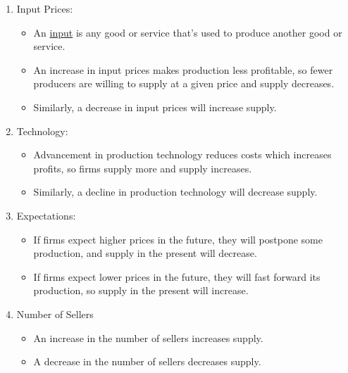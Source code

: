 	\begin{enumerate}
	
	\item Input Prices: 
	
		\begin{itemize}
		
		\item An \underline{input} is any good or service that's used to produce another good or service.
		
		\item An increase in input prices makes production less profitable, so fewer producers are willing to supply at a given price and supply decreases.
		
		\item Similarly, a decrease in input prices will increase supply.
		
		\end{itemize}
		
	\item Technology:
	
		\begin{itemize}
		
		\item Advancement in production technology reduces costs which increases profits, so firms supply more and supply increases.
		
		\item Similarly, a decline in production technology will decrease supply.
		
		\end{itemize}
		
	\item Expectations:
		
		\begin{itemize}
		
		\item If firms expect higher prices in the future, they will postpone some production, and supply in the present will decrease.
		
		\item If firms expect lower prices in the future, they will fast forward its production, so supply in the present will increase.
		
		\end{itemize}
		
	\item Number of Sellers
	
		\begin{itemize}
	
		\item An increase in the number of sellers increases supply.
		
		\item A decrease in the number of sellers decreases supply.
		
		\end{itemize}
	
	\end{enumerate}
	
